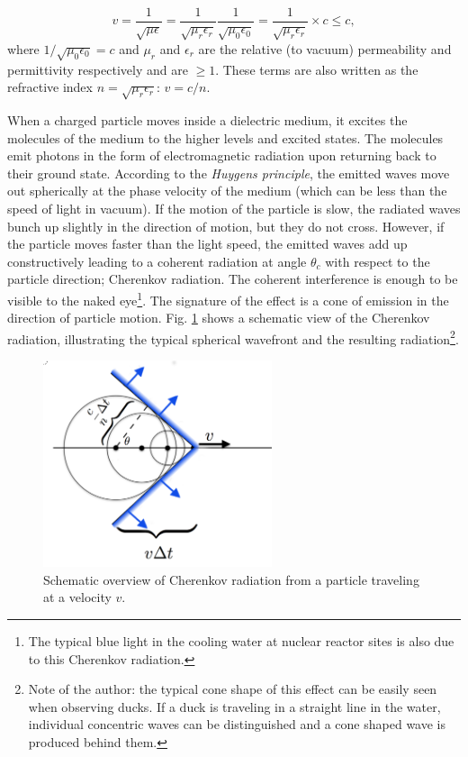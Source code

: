 \begin{equation}
v = \frac{1}{\sqrt{\mu \epsilon}} = \frac{1}{\sqrt{\mu_r \epsilon_r}}\frac{1}{\sqrt{\mu_0 \epsilon_0}} = \frac{1}{\sqrt{\mu_r \epsilon_r}} \times c \leq c,
\end{equation}
where $1/\sqrt{\mu_0 \epsilon_0} = c$ and $\mu_r$ and $\epsilon_r$ are the relative (to vacuum) permeability and permittivity respectively and are $\geq 1$. These terms are also written as the refractive index $n = \sqrt{\mu_r \epsilon_r}$: $v = c/n$.

When a charged particle moves inside a dielectric medium, it excites the molecules of the medium to the higher levels and excited states. The molecules emit photons in the form of electromagnetic radiation upon returning back to their ground state. According to the \textit{Huygens principle}, the emitted waves move out spherically at the phase velocity of the medium (which can be less than the speed of light in vacuum). If the motion of the particle is slow, the radiated waves bunch up slightly in the direction of motion, but they do not cross. However, if the particle moves faster than the light speed, the emitted waves add up constructively leading to a coherent radiation at angle $\theta_c$ with respect to the particle direction; Cherenkov radiation. The coherent interference is enough to be visible to the naked eye\footnote{The typical blue light in the cooling water at nuclear reactor sites is also due to this Cherenkov radiation.}. The signature of the effect is a cone of emission in the direction of particle motion. Fig. \ref{fig:cherenkov} shows a schematic view of the Cherenkov radiation, illustrating the typical spherical wavefront and the resulting radiation\footnote{Note of the author: the typical cone shape of this effect can be easily seen when observing ducks. If a duck is traveling in a straight line in the water, individual concentric waves can be distinguished and a cone shaped wave is produced behind them.}.

\begin{figure}[ht]
\centering
\includegraphics[width=0.6\textwidth]{chapter4/img/cherenkov2.png}
\caption{Schematic overview of Cherenkov radiation from a particle traveling at a velocity $v$.}
\label{fig:cherenkov}
\end{figure}

